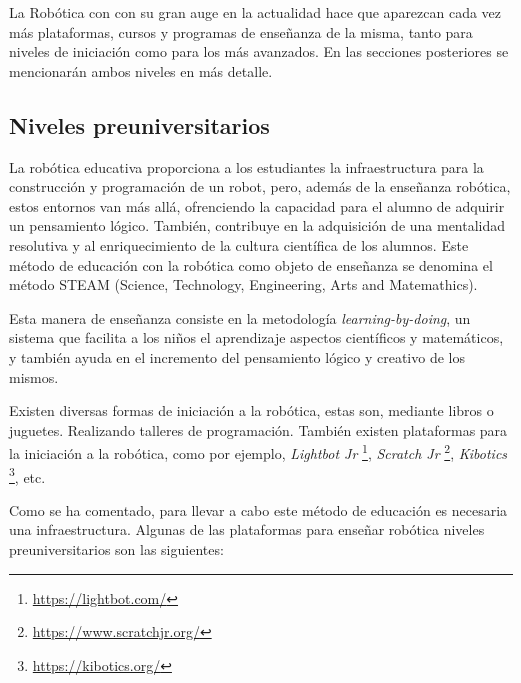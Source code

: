 \documentclass[a4paper, 12pt]{book}
\begin{document}
La Robótica con con su gran auge en la actualidad hace que aparezcan cada vez más plataformas, cursos y programas de enseñanza de la misma, tanto para niveles de iniciación como para los más avanzados. En las secciones posteriores se mencionarán ambos niveles en más detalle.

\subsection{Niveles preuniversitarios}

La robótica educativa proporciona a los estudiantes la infraestructura para la construcción y programación de un robot, pero, además de la enseñanza robótica,
estos entornos van más allá, ofrenciendo la capacidad para el alumno de adquirir un pensamiento lógico. También, contribuye en la adquisición de una mentalidad resolutiva y al enriquecimiento de la cultura científica de los alumnos. Este método de educación con la robótica como objeto de enseñanza se denomina el método STEAM (Science, Technology, Engineering, Arts and Matemathics).

Esta manera de enseñanza consiste en la metodología \emph{learning-by-doing}, un sistema que facilita a los niños el aprendizaje aspectos científicos y matemáticos, y también ayuda en el incremento del pensamiento lógico y creativo de los mismos.

Existen diversas formas de iniciación a la robótica, estas son, mediante libros o juguetes. Realizando talleres de programación. También existen plataformas para la iniciación a la robótica, como por ejemplo, \emph{Lightbot Jr} \footnote{\url{https://lightbot.com/}}, \emph{Scratch Jr} \footnote{\url{https://www.scratchjr.org/}}, \emph{Kibotics} \footnote{\url{https://kibotics.org/}}, etc.

Como se ha comentado, para llevar a cabo este método de educación es necesaria una infraestructura. Algunas de las plataformas para enseñar robótica niveles preuniversitarios son las siguientes:
\end{document}
